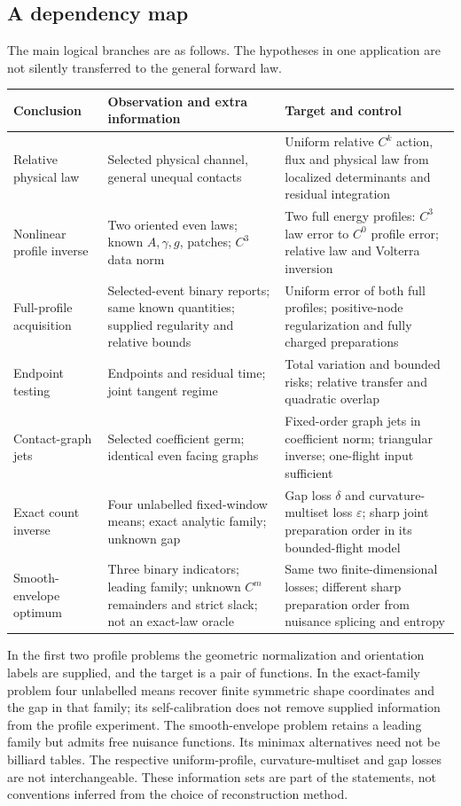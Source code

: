 \subsection{A dependency map}
The main logical branches are as follows. The hypotheses in one
application are not silently transferred to the general forward law.
\begin{center}
\begin{tabular}{@{}p{}p{}p{}@{}}
\toprule
Conclusion & Observation and extra information & Target and control\\
\midrule
Relative physical law & Selected physical channel, general unequal contacts &
Uniform relative $C^k$ action, flux and physical law from localized
determinants and residual integration\\[3pt]
Nonlinear profile inverse & Two oriented even laws; known $A,\gamma,g$, patches;
$C^3$ data norm & Two full energy profiles: $C^3$ law error to $C^0$ profile error;
relative law and Volterra inversion\\[3pt]
Full-profile acquisition & Selected-event binary reports; same known
quantities; supplied regularity and relative bounds & Uniform error of both full profiles; positive-node regularization
and fully charged preparations\\[3pt]
Endpoint testing & Endpoints and residual time; joint tangent regime &
Total variation and bounded risks; relative transfer and quadratic
overlap\\[3pt]
Contact-graph jets & Selected coefficient germ; identical even facing
graphs & Fixed-order graph jets in coefficient norm; triangular inverse;
one-flight input sufficient\\[3pt]
Exact count inverse & Four unlabelled fixed-window means; exact analytic family; unknown gap &
Gap loss $\delta$ and curvature-multiset loss $\varepsilon$;
sharp joint preparation order in its bounded-flight model\\[3pt]
Smooth-envelope optimum & Three binary indicators; leading family;
unknown $C^m$ remainders and strict slack; not an exact-law oracle & Same two finite-dimensional losses; different sharp preparation
order from nuisance splicing and entropy\\
\bottomrule
\end{tabular}
\end{center}

In the first two profile problems the geometric normalization and
orientation labels are supplied, and the target is a pair of functions.
In the exact-family problem four unlabelled means recover finite
symmetric shape coordinates and the gap in that family; its self-calibration
does not remove supplied information from the profile experiment.
The smooth-envelope problem retains a leading family but admits free
nuisance functions. Its minimax alternatives need not be billiard tables.
The respective uniform-profile, curvature-multiset and gap losses are
not interchangeable. These information sets are part of the statements,
not conventions inferred from the choice of reconstruction method.

